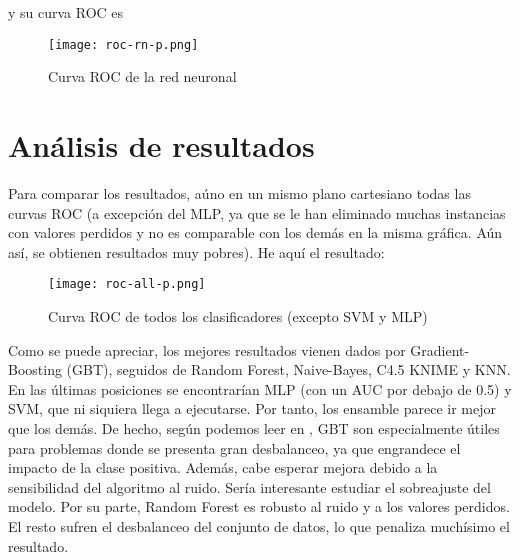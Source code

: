 y su curva ROC es

\begin{figure}[H] %
	\centering
	\texttt{[image: roc-rn-p.png]}  %
	\caption{Curva ROC de la red neuronal} 
	\label{fig:rocrn-p}
\end{figure}




\section{Análisis de resultados}

Para comparar los resultados, aúno en un mismo plano cartesiano todas las curvas ROC (a excepción del MLP, ya que se le han eliminado muchas instancias con valores perdidos y no es comparable con los demás en la misma gráfica. Aún así, se obtienen resultados muy pobres). He aquí el resultado:

\begin{figure}[H] %
	\centering
	\texttt{[image: roc-all-p.png]}  %
	\caption{Curva ROC de todos los clasificadores (excepto SVM y MLP)} 
	\label{fig:rocall-p}
\end{figure}

Como se puede apreciar, los mejores resultados vienen dados por Gradient-Boosting (GBT), seguidos de Random Forest, Naive-Bayes, C4.5 KNIME y KNN. En las últimas posiciones se encontrarían MLP (con un AUC por debajo de 0.5) y SVM, que ni siquiera llega a ejecutarse. Por tanto, los ensamble parece ir mejor que los demás. De hecho, según podemos leer en \cite{friedman}, GBT son especialmente útiles para problemas donde se presenta gran desbalanceo, ya que engrandece el impacto de la clase positiva. Además, cabe esperar mejora debido a la sensibilidad del algoritmo al ruido. Sería interesante estudiar el sobreajuste del modelo. Por su parte, Random Forest es robusto al ruido y a los valores perdidos. El resto sufren el desbalanceo del conjunto de datos, lo que penaliza muchísimo el resultado. 


